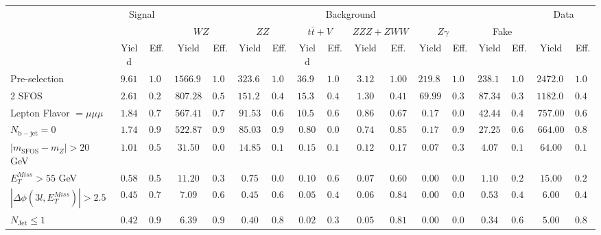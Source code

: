 \begin{tabular}{l||c|c||c|c||c|c||c|c||c|c||c|c||c|c||c|c}
\hline
 &                 \multicolumn{2}{c||}{Signal}            &  \multicolumn{12}{c||}{Background} &  \multicolumn{2}{c}{Data} \\
 & &  & \multicolumn{2}{c||}{$WZ$} & \multicolumn{2}{c||}{$ZZ$} & \multicolumn{2}{c||}{$t\bar{t}+V$} & \multicolumn{2}{c||}{$ZZZ+ZWW$} & \multicolumn{2}{c||}{$Z\gamma$} & \multicolumn{2}{c||}{Fake} &  & \\ 
 & Yield & Eff. & Yield & Eff. & Yield & Eff. & Yield & Eff. & Yield & Eff. & Yield & Eff. & Yield & Eff. & Yield & Eff.\\
\hline\hline
Pre-selection &  $9.61$ &  $1.00$ &  $1566.90$ &  $1.00$ &  $323.60$ &  $1.00$ &  $36.93$ &  $1.00$ &  $3.12$ &  $1.00$ &  $219.80$ &  $1.00$ &  $238.12$ &  $1.00$ &  $2472.00$ &  $1.00$\\ 
\hline
2 SFOS &  $2.61$ &  $0.27$ &  $807.28$ &  $0.52$ &  $151.28$ &  $0.47$ &  $15.35$ &  $0.42$ &  $1.30$ &  $0.41$ &  $69.99$ &  $0.32$ &  $87.34$ &  $0.37$ &  $1182.00$ &  $0.48$\\ 
\hline
Lepton Flavor $= \mu\mu\mu$ &  $1.84$ &  $0.71$ &  $567.41$ &  $0.70$ &  $91.53$ &  $0.61$ &  $10.50$ &  $0.68$ &  $0.86$ &  $0.67$ &  $0.17$ &  $0.00$ &  $42.44$ &  $0.49$ &  $757.00$ &  $0.64$\\ 
\hline
$N_{\mathrm{b-jet}}=0$ &  $1.74$ &  $0.94$ &  $522.87$ &  $0.92$ &  $85.03$ &  $0.93$ &  $0.80$ &  $0.08$ &  $0.74$ &  $0.85$ &  $0.17$ &  $0.99$ &  $27.25$ &  $0.64$ &  $664.00$ &  $0.88$\\ 
\hline
$| m_{\mathrm{SFOS}} - m_Z | >  20$ GeV &  $1.01$ &  $0.58$ &  $31.50$ &  $0.06$ &  $14.85$ &  $0.17$ &  $0.15$ &  $0.19$ &  $0.12$ &  $0.17$ &  $0.07$ &  $0.39$ &  $4.07$ &  $0.15$ &  $64.00$ &  $0.10$\\ 
\hline
$E_{T}^{Miss} > 55$ GeV &  $0.58$ &  $0.57$ &  $11.20$ &  $0.36$ &  $0.75$ &  $0.05$ &  $0.10$ &  $0.64$ &  $0.07$ &  $0.60$ &  $0.00$ &  $0.00$ &  $1.10$ &  $0.27$ &  $15.00$ &  $0.23$\\ 
\hline
$|\Delta\phi(3l,E_{T}^{Miss})| > 2.5$ &  $0.45$ &  $0.78$ &  $7.09$ &  $0.63$ &  $0.45$ &  $0.61$ &  $0.05$ &  $0.48$ &  $0.06$ &  $0.84$ &  $0.00$ &  $0.00$ &  $0.53$ &  $0.48$ &  $6.00$ &  $0.40$\\ 
\hline
$N_{\mathrm{Jet}} \leq 1$ &  $0.42$ &  $0.94$ &  $6.39$ &  $0.90$ &  $0.40$ &  $0.88$ &  $0.02$ &  $0.38$ &  $0.05$ &  $0.81$ &  $0.00$ &  $0.00$ &  $0.34$ &  $0.64$ &  $5.00$ &  $0.83$\\ 
\hline
\end{tabular}
